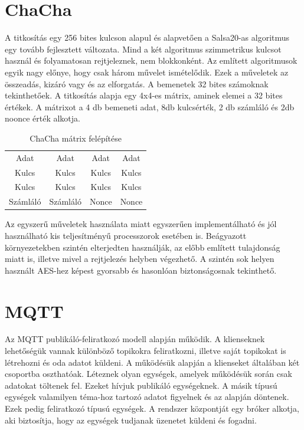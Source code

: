 
\section{ChaCha}
A titkosítás egy 256 bites kulcson alapul és alapvetően a Salsa20-as algoritmus egy tovább fejlesztett változata. Mind a két algoritmus szimmetrikus kulcsot használ és folyamatosan rejtjeleznek, nem blokkonként. Az említett algoritmusok egyik nagy előnye, hogy csak három művelet ismételődik. Ezek a műveletek az összeadás, kizáró vagy és az elforgatás. A bemenetek 32 bites számoknak tekinthetőek. A titkosítás alapja egy 4x4-es mátrix, aminek elemei a 32 bites értékek. A mátrixot a 4 db bemeneti adat, 8db kulcsérték, 2 db számláló és 2db noonce érték alkotja.

\begin{table}[h]
	\footnotesize
	\centering
	\begin{tabular}{ c c c c }
		Adat & Adat & Adat & Adat \\
		Kulcs & Kulcs & Kulcs & Kulcs \\
		Kulcs & Kulcs & Kulcs & Kulcs \\
		Számláló & Számláló & Nonce & Nonce \\
	\end{tabular}
	\caption{ChaCha mátrix felépítése}
	\label{tab:TabularExample}
\end{table}

Az egyszerű műveletek használata miatt egyszerűen implementálható és jól használható kis teljesítményű processzorok esetében is. Beágyazott környezetekben szintén elterjedten használják, az előbb említett tulajdonság miatt is, illetve mivel a rejtjelezés helyben végezhető. A szintén sok helyen használt AES-hez képest gyorsabb és hasonlóan biztonságosnak tekinthető.

\section{MQTT}
Az MQTT publikáló-feliratkozó modell alapján működik. A klienseknek lehetőségük vannak különböző topikokra feliratkozni, illetve saját topikokat is létrehozni és oda adatot küldeni. A működésük alapján a klienseket általában két csoportba oszthatóak. Léteznek olyan egységek, amelyek működésük során csak adatokat töltenek fel. Ezeket hívjuk publikáló egységeknek. A másik típusú egységek valamilyen téma-hoz tartozó adatot figyelnek és az alapján döntenek. Ezek pedig feliratkozó típusú egységek. A rendszer központját egy bróker alkotja, aki biztosítja, hogy az egységek tudjanak üzenetet küldeni és fogadni.

